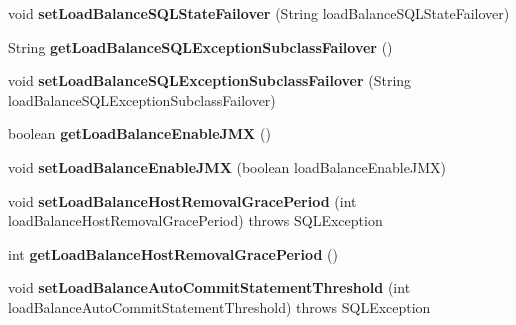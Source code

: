 \begin{DoxyCompactItemize}
void {\bfseries set\+Load\+Balance\+S\+Q\+L\+State\+Failover} (String load\+Balance\+S\+Q\+L\+State\+Failover)
\item 
\mbox{\label{interfacecom_1_1mysql_1_1jdbc_1_1_connection_properties_a94ef6c590b36c2fd22ec43f5425d70da}} 
String {\bfseries get\+Load\+Balance\+S\+Q\+L\+Exception\+Subclass\+Failover} ()
\item 
\mbox{\label{interfacecom_1_1mysql_1_1jdbc_1_1_connection_properties_a0ae6e083113aaa9f31306f834254fb7e}} 
void {\bfseries set\+Load\+Balance\+S\+Q\+L\+Exception\+Subclass\+Failover} (String load\+Balance\+S\+Q\+L\+Exception\+Subclass\+Failover)
\item 
\mbox{\label{interfacecom_1_1mysql_1_1jdbc_1_1_connection_properties_af6e05f78c701064e4540800411563d4e}} 
boolean {\bfseries get\+Load\+Balance\+Enable\+J\+MX} ()
\item 
\mbox{\label{interfacecom_1_1mysql_1_1jdbc_1_1_connection_properties_a362ab5acb4b5ec1b506c891802722b54}} 
void {\bfseries set\+Load\+Balance\+Enable\+J\+MX} (boolean load\+Balance\+Enable\+J\+MX)
\item 
\mbox{\label{interfacecom_1_1mysql_1_1jdbc_1_1_connection_properties_afba29baa45e272a4f2abffe0bfab2da0}} 
void {\bfseries set\+Load\+Balance\+Host\+Removal\+Grace\+Period} (int load\+Balance\+Host\+Removal\+Grace\+Period)  throws S\+Q\+L\+Exception
\item 
\mbox{\label{interfacecom_1_1mysql_1_1jdbc_1_1_connection_properties_a56c0f04781d86acc7ca9404881811bfc}} 
int {\bfseries get\+Load\+Balance\+Host\+Removal\+Grace\+Period} ()
\item 
\mbox{\label{interfacecom_1_1mysql_1_1jdbc_1_1_connection_properties_a009f0f098deb81eef826f7d182e9a902}} 
void {\bfseries set\+Load\+Balance\+Auto\+Commit\+Statement\+Threshold} (int load\+Balance\+Auto\+Commit\+Statement\+Threshold)  throws S\+Q\+L\+Exception

\end{DoxyCompactItemize}
